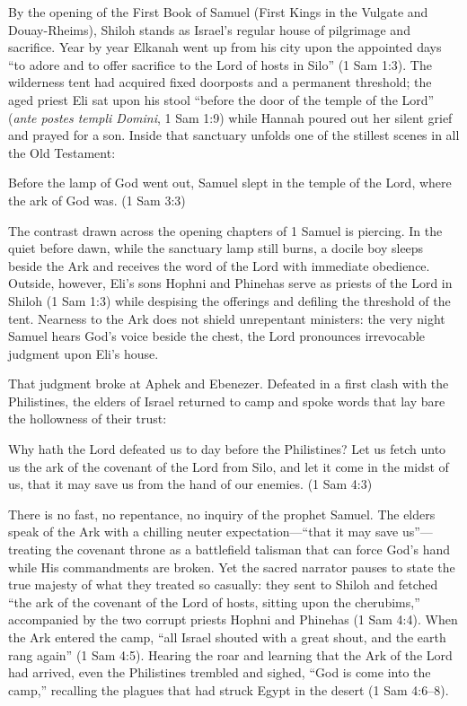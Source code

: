 By the opening of the First Book of Samuel (First Kings in the Vulgate and Douay-Rheims), Shiloh stands as Israel's regular house of pilgrimage and sacrifice. Year by year Elkanah went up from his city upon the appointed days ``to adore and to offer sacrifice to the Lord of hosts in Silo'' (1 Sam 1:3). The wilderness tent had acquired fixed doorposts and a permanent threshold; the aged priest Eli sat upon his stool ``before the door of the temple of the Lord'' (\textit{ante postes templi Domini}, 1 Sam 1:9) while Hannah poured out her silent grief and prayed for a son. Inside that sanctuary unfolds one of the stillest scenes in all the Old Testament:

\begin{scriptureblock}
Before the lamp of God went out, Samuel slept in the temple of the Lord, where the ark of God was. \textnormal{(1 Sam 3:3)}
\end{scriptureblock}

The contrast drawn across the opening chapters of 1 Samuel is piercing. In the quiet before dawn, while the sanctuary lamp still burns, a docile boy sleeps beside the Ark and receives the word of the Lord with immediate obedience. Outside, however, Eli's sons Hophni and Phinehas serve as priests of the Lord in Shiloh (1 Sam 1:3) while despising the offerings and defiling the threshold of the tent. Nearness to the Ark does not shield unrepentant ministers: the very night Samuel hears God's voice beside the chest, the Lord pronounces irrevocable judgment upon Eli's house.

That judgment broke at Aphek and Ebenezer. Defeated in a first clash with the Philistines, the elders of Israel returned to camp and spoke words that lay bare the hollowness of their trust:

\begin{scriptureblock}
Why hath the Lord defeated us to day before the Philistines? Let us fetch unto us the ark of the covenant of the Lord from Silo, and let it come in the midst of us, that it may save us from the hand of our enemies. \textnormal{(1 Sam 4:3)}
\end{scriptureblock}

There is no fast, no repentance, no inquiry of the prophet Samuel. The elders speak of the Ark with a chilling neuter expectation---``that it may save us''---treating the covenant throne as a battlefield talisman that can force God's hand while His commandments are broken. Yet the sacred narrator pauses to state the true majesty of what they treated so casually: they sent to Shiloh and fetched ``the ark of the covenant of the Lord of hosts, sitting upon the cherubims,'' accompanied by the two corrupt priests Hophni and Phinehas (1 Sam 4:4). When the Ark entered the camp, ``all Israel shouted with a great shout, and the earth rang again'' (1 Sam 4:5). Hearing the roar and learning that the Ark of the Lord had arrived, even the Philistines trembled and sighed, ``God is come into the camp,'' recalling the plagues that had struck Egypt in the desert (1 Sam 4:6--8).

